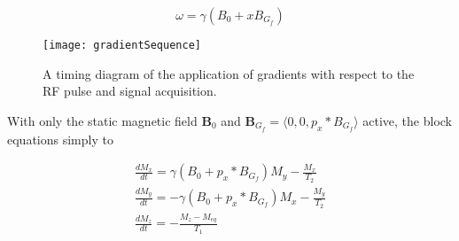 
\begin{displaymath}
  \omega = \gamma (B_0 + x B_{G_f})
\end{displaymath}




\begin{figure}
  \centering
  \texttt{[image: gradientSequence]}
  \caption{A timing diagram of the application of gradients with
    respect to the RF pulse and signal acquisition.}
  \label{fig:gradientSequence}
\end{figure}


With only the static magnetic field $\mathbf{B}_0$ and
$\mathbf{B}_{G_f} = \langle 0, 0, p_x * B_{G_f} \rangle$ active, the
block equations simply to


\begin{displaymath}
  \begin{array}{l}
    \frac{dM_x}{dt} = \gamma (B_0 + p_x * B_{G_f}) M_y - \frac{M_x}{T_2} \\
    \frac{dM_y}{dt} = - \gamma (B_0 + p_x * B_{G_f}) M_x - \frac{M_y}{T_2} \\
    \frac{dM_z}{dt} = - \frac{M_z - M_{eq}}{T_1}
  \end{array}
\end{displaymath}



